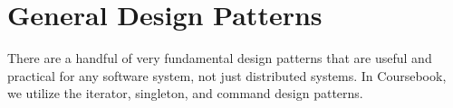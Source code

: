 \chapter{General Design Patterns}

There are a handful of very fundamental design patterns that are useful and
practical for any software system, not just distributed systems. In Coursebook,
we utilize the iterator, singleton, and command design patterns.
